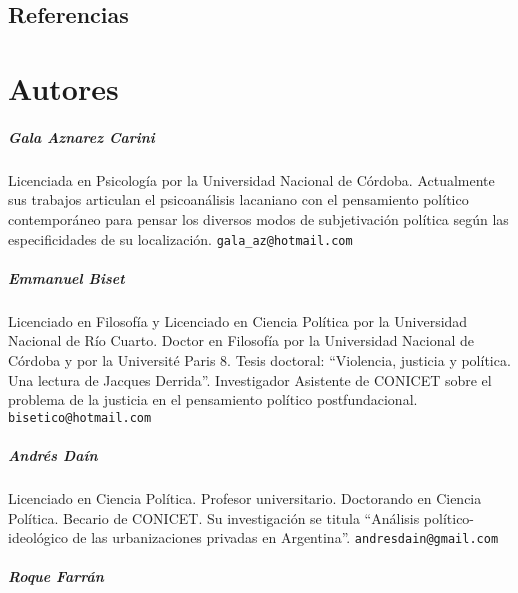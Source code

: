 \section*{Referencias}
\printbibliography[heading=none]   %

\backmatter %

\chapter{Autores}


\paragraph{Gala Aznarez Carini}


Licenciada en Psicología por la Universidad Nacional de Córdoba. Actualmente sus trabajos articulan el psicoanálisis lacaniano con el pensamiento político contemporáneo para pensar los diversos modos de subjetivación política según las especificidades de su localización. \nolinkurl{gala\_az@hotmail.com}

\paragraph{Emmanuel Biset}


Licenciado en Filosofía y Licenciado en Ciencia Política por la Universidad Nacional de Río Cuarto. Doctor en Filosofía por la Universidad Nacional de Córdoba y por la Université Paris 8. Tesis doctoral: \enquote{Violencia, justicia y política. Una lectura de Jacques Derrida}. Investigador Asistente de CONICET sobre el problema de la justicia en el pensamiento político postfundacional. \nolinkurl{bisetico@hotmail.com}


\paragraph{Andrés Daín}


Licenciado en Ciencia Política. Profesor universitario. Doctorando en Ciencia Política. Becario de CONICET. Su investigación se titula \enquote{Análisis político-ideológico de las urbanizaciones privadas en Argentina}. \nolinkurl{andresdain@gmail.com}


\paragraph{Roque Farrán}


